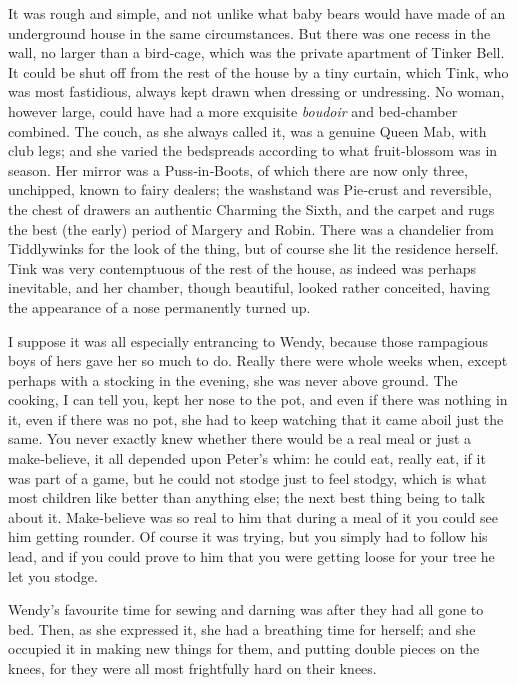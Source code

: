 It was rough and simple,
and not unlike what baby bears would have made of an underground house in the same circumstances.
But there was one recess in the wall, no larger than a bird‐cage,
which was the private apartment of Tinker Bell.
It could be shut off from the rest of the house by a tiny curtain,
which Tink, who was most fastidious, always kept drawn when dressing or undressing.
No woman, however large, could have had a more exquisite \emph{boudoir} and bed‐chamber combined.
The couch, as she always called it, was a genuine Queen Mab, with club legs;
and she varied the bedspreads according to what fruit‐blossom was in season.
Her mirror was a Puss‐in‐Boots, of which there are now only three, unchipped, known to fairy dealers;
the washstand was Pie‐crust and reversible,
the chest of drawers an authentic Charming the Sixth,
and the carpet and rugs the best (the early) period of Margery and Robin.
There was a chandelier from Tiddlywinks for the look of the thing,
but of course she lit the residence herself.
Tink was very contemptuous of the rest of the house, as indeed was perhaps inevitable,
and her chamber, though beautiful, looked rather conceited,
having the appearance of a nose permanently turned up.

I suppose it was all especially entrancing to Wendy,
because those rampagious boys of hers gave her so much to do.
Really there were whole weeks when, except perhaps with a stocking in the evening, she was never above ground.
The cooking, I can tell you, kept her nose to the pot,
and even if there was nothing in it, even if there was no pot,
she had to keep watching that it came aboil just the same.
You never exactly knew whether there would be a real meal or just a make‐believe,
it all depended upon Peter’s whim:
he could eat, really eat, if it was part of a game,
but he could not stodge just to feel stodgy, which is what most children like better than anything else;
the next best thing being to talk about it.
Make‐believe was so real to him that during a meal of it you could see him getting rounder.
Of course it was trying, but you simply had to follow his lead,
and if you could prove to him that you were getting loose for your tree he let you stodge.

Wendy’s favourite time for sewing and darning was after they had all gone to bed.
Then, as she expressed it, she had a breathing time for herself;
and she occupied it in making new things for them, and putting double pieces on the knees,
for they were all most frightfully hard on their knees.


